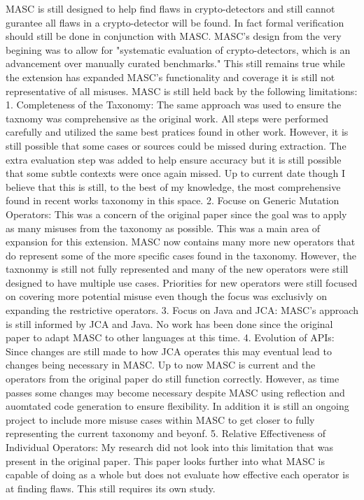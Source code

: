 MASC is still designed to help find flaws in crypto-detectors and still cannot gurantee all flaws in a crypto-detector will be found. In fact formal verification should still be done in conjunction with MASC. MASC's design from the very begining was to allow for "systematic evaluation of crypto-detectors, which is an advancement over manually curated benchmarks." This still remains true while the extension has expanded MASC's functionality and coverage it is still not representative of all misuses. MASC is still held back by the following limitations:
1. Completeness of the Taxonomy: The same approach was used to ensure the taxnomy was comprehensive as the original work. All steps were performed carefully and utilized the same best pratices found in other work. However, it is still possible that some cases or sources could be missed during extraction. The extra evaluation step was added to help ensure accuracy but it is still possible that some subtle contexts were once again missed. Up to current date though I believe that this is still, to the best of my knowledge, the most comprehensive found in recent works taxonomy in this space.
2. Focuse on Generic Mutation Operators: This was a concern of the original paper since the goal was to apply as many misuses from the taxonomy as possible. This was a main area of expansion for this extension. MASC now contains many more new operators that do represent some of the more specific cases found in the taxonomy. However, the taxnonmy is still not fully represented and many of the new operators were still designed to have multiple use cases. Priorities for new operators were still focused on covering more potential misuse even though the focus was exclusivly on expanding the restrictive operators.
3. Focus on Java and JCA: MASC's approach is still informed by JCA and Java. No work has been done since the original paper to adapt MASC to other languages at this time.
4. Evolution of APIs: Since changes are still made to how JCA operates this may eventual lead to changes being necessary in MASC. Up to now MASC is current and the operators from the original paper do still function correctly. However, as time passes some changes may become necessary despite MASC using reflection and auomtated code generation to ensure flexibility. In addition it is still an ongoing project to include more misuse cases within MASC to get closer to fully representing the current taxonomy and beyonf.
5. Relative Effectiveness of Individual Operators: My research did not look into this limitation that was present in the original paper. This paper looks further into what MASC is capable of doing as a whole but does not evaluate how effective each operator is at finding flaws. This still requires its own study.
